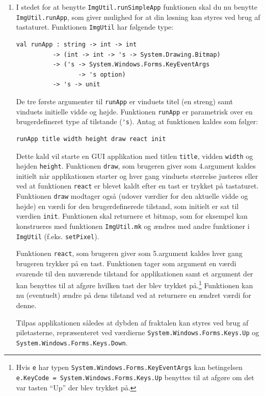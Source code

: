 \documentclass[a4paper,12pt]{article}
\begin{document}
\begin{enumerate}[label=7ø.\arabic*,start=0]
\item\label{sierpinskikeys.ov} I stedet for at benytte
  \lstinline{ImgUtil.runSimpleApp} funktionen skal du nu benytte
  \lstinline{ImgUtil.runApp}, som giver mulighed for at din løsning
  kan styres ved brug af tastaturet. Funktionen \lstinline{ImgUtil}
  har følgende type:
\begin{footnotesize}
\begin{lstlisting}[numbers=none,frame=none,mathescape]
val runApp : string -> int -> int
          -> (int -> int -> 's -> System.Drawing.Bitmap)
          -> ('s -> System.Windows.Forms.KeyEventArgs
                 -> 's option)
          -> 's -> unit
\end{lstlisting}
\end{footnotesize}
De tre første argumenter til \lstinline{runApp} er vinduets titel (en
streng) samt vinduets initielle vidde og højde. Funktionen
\lstinline{runApp} er parametrisk over en brugerdefineret type af tilstande (\lstinline{'s}). Antag at funktionen kaldes som følger:
\begin{footnotesize}
\begin{lstlisting}[numbers=none,frame=none,mathescape]
  runApp title width height draw react init
\end{lstlisting}
\end{footnotesize}
Dette kald vil starte en GUI applikation med titlen \lstinline{title},
vidden \lstinline{width} og højden \lstinline{height}. Funktionen
\lstinline{draw}, som brugeren giver som 4.\@ argument kaldes initielt
når applikationen starter og hver gang vinduets størrelse justeres
eller ved at funktionen \lstinline{react} er blevet kaldt efter en
tast er trykket på tastaturet. Funktionen \lstinline{draw} modtager
også (udover værdier for den aktuelle vidde og højde) en værdi for den
brugerdefinerede tilstand, som initielt er sat til værdien
\lstinline{init}. Funktionen skal returnere et bitmap, som for
eksempel kan konstrueres med funktionen \lstinline{ImgUtil.mk} og
ændres med andre funktioner i \lstinline{ImgUtil}
(f.eks. \lstinline{setPixel}).

Funktionen \lstinline{react}, som brugeren giver som 5.\@ argument
kaldes hver gang brugeren trykker på en tast. Funktionen tager som
argument en værdi svarende til den nuværende tilstand for
applikationen samt et argument der kan benyttes til at afgøre hvilken
tast der blev trykket på.\footnote{Hvis \lstinline{e} har typen
  \lstinline{System.Windows.Forms.KeyEventArgs} kan betingelsen
  \lstinline{e.KeyCode = System.Windows.Forms.Keys.Up} benyttes til at
  afgøre om det var tasten ``Up'' der blev trykket på.} Funktionen kan
nu (eventuelt) ændre på dens tilstand ved at returnere en ændret værdi
for denne.

Tilpas applikationen således at dybden af
fraktalen kan styres ved brug af piletasterne, repræsenteret ved værdierne
\lstinline{System.Windows.Forms.Keys.Up} og
\lstinline{System.Windows.Forms.Keys.Down}.
\end{enumerate}
\end{document}
